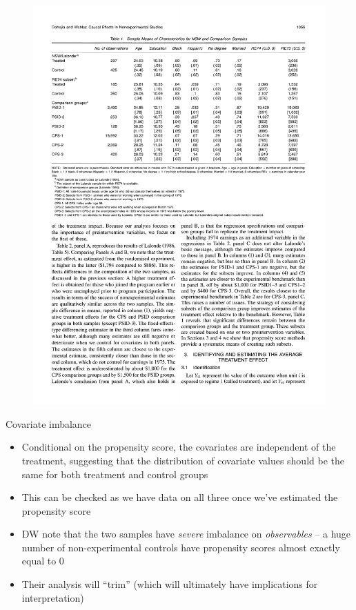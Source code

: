 \documentclass{beamer}
\begin{document}
\begin{frame}[plain]
	
\begin{figure}
\includegraphics[scale=0.5]{./lecture_includes/dw_1.pdf}
\end{figure}

\end{frame}


\begin{frame}{Covariate imbalance}
	

	\begin{itemize}
	\item Conditional on the propensity score, the covariates are independent of the treatment, suggesting that the distribution of covariate values should be the same for both treatment and control groups
	\item This can be checked as we have data on all three once we've estimated the propensity score
	\item DW note that the two samples have \emph{severe} imbalance on \emph{observables} -- a huge number of non-experimental controls have propensity scores almost exactly equal to 0
	\item Their analysis will ``trim'' (which will ultimately have implications for interpretation)
	\end{itemize}

\end{frame}
\end{document}
